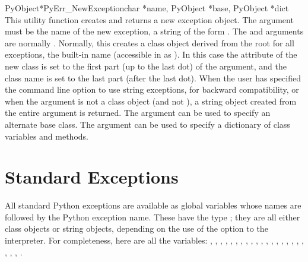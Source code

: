 \documentclass{manual}
\begin{document}
\begin{cfuncdesc}{PyObject*}{PyErr_NewException}{char *name,
                                                 PyObject *base,
                                                 PyObject *dict}
This utility function creates and returns a new exception object.  The
 argument must be the name of the new exception, a \C{} string
of the form .  The  and 
arguments are normally \NULL{}.  Normally, this creates a class
object derived from the root for all exceptions, the built-in name
 (accessible in \C{} as ).
In this case the  attribute of the new class is set to the
first part (up to the last dot) of the  argument, and the
class name is set to the last part (after the last dot).  When the
user has specified the  command line option to use string
exceptions, for backward compatibility, or when the 
argument is not a class object (and not \NULL{}), a string object
created from the entire  argument is returned.  The
 argument can be used to specify an alternate base class.
The  argument can be used to specify a dictionary of class
variables and methods.
\end{cfuncdesc}


\section{Standard Exceptions \label{standardExceptions}}

All standard Python exceptions are available as global variables whose
names are  followed by the Python exception name.
These have the type ; they are all either class
objects or string objects, depending on the use of the 
option to the interpreter.  For completeness, here are all the
variables:
,
,
,
,
,
,
,
,
,
,
,
,
,
,
,
,
,
,
,
,
,
,
.
\end{document}
